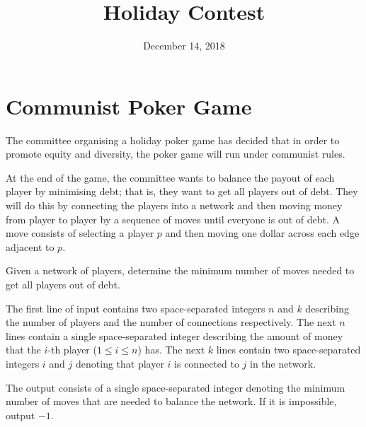 \documentclass{contest-set}
\title{Holiday Contest}
\date{December 14, 2018}
\institute{Stephen Lewis Secondary School}
\begin{document}
\maketitle

\section{Communist Poker Game}
The committee organising a holiday poker game has decided that in order to promote equity and diversity, the poker game will run under communist rules.

At the end of the game, the committee wants to balance the payout of each player by minimising debt; that is, they want to get all players out of debt. They will do this by connecting the players into a network and then moving money from player to player by a sequence of moves until everyone is out of debt. A move consists of selecting a player $p$ and then moving one dollar across each edge adjacent to $p$. 

Given a network of players, determine the minimum number of moves needed to get all players out of debt.

The first line of input contains two space-separated integers $n$ and $k$ describing the number of players and the number of connections respectively. The next $n$ lines contain a single space-separated integer describing the amount of money that the $i$-th player ($1 \leq i \leq n$) has. The next $k$ lines contain two space-separated integers $i$ and $j$ denoting that player $i$ is connected to $j$ in the network.

\outputformat
The output consists of a single space-separated integer denoting the minimum number of moves that are needed to balance the network. If it is impossible, output $-1$.
\end{document}
